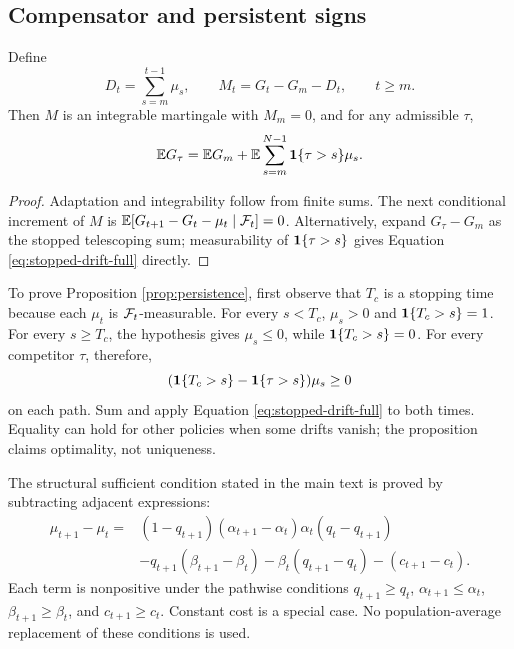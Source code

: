 \subsection{Compensator and persistent signs}
\begin{lemma}
\label{lem:doob-full}
Define
\[
 D_t=\sum_{s=m}^{t-1}\mu_s,\qquad M_t=G_t-G_m-D_t,\qquad t\ge m.
\]
Then \(M\) is an integrable martingale with \(M_m=0\), and for any admissible
\(\tau\),
\begin{equation}
 \mathbb E G_\tau=\mathbb E G_m+
 \mathbb E\sum_{s=m}^{N-1}\mathbf 1\{\tau>s\}\mu_s .
 \label{eq:stopped-drift-full}
\end{equation}
\end{lemma}
\begin{proof}
Adaptation and integrability follow from finite sums.
The next conditional increment of \(M\) is
\(\mathbb E[G_{t+1}-G_t-\mu_t\mid\mathcal F_t]=0\).
Alternatively, expand \(G_\tau-G_m\) as the stopped telescoping sum;
measurability of \(\mathbf 1\{\tau>s\}\) gives Equation
\eqref{eq:stopped-drift-full} directly.
\end{proof}

To prove Proposition \ref{prop:persistence}, first observe that \(T_c\)
is a stopping time because each \(\mu_t\) is \(\mathcal F_t\)-measurable.
For every \(s<T_c\), \(\mu_s>0\) and \(\mathbf 1\{T_c>s\}=1\).
For every \(s\ge T_c\), the hypothesis gives \(\mu_s\le0\), while
\(\mathbf 1\{T_c>s\}=0\). For every competitor \(\tau\), therefore,
\[
 (\mathbf 1\{T_c>s\}-\mathbf 1\{\tau>s\})\mu_s\ge0
\]
on each path. Sum and apply Equation \eqref{eq:stopped-drift-full} to both
times. Equality can hold for other policies when some drifts vanish;
the proposition claims optimality, not uniqueness.

The structural sufficient condition stated in the main text is proved by
subtracting adjacent expressions:
\begin{align}
 \mu_{t+1}-\mu_t={}&
 (1-q_{t+1})(\alpha_{t+1}-\alpha_t)
 \alpha_t(q_t-q_{t+1}) \nonumber\\
 &-q_{t+1}(\beta_{t+1}-\beta_t)
 -\beta_t(q_{t+1}-q_t)-(c_{t+1}-c_t).
 \label{eq:monotone-drift-full}
\end{align}
Each term is nonpositive under the pathwise conditions
\(q_{t+1}\ge q_t\), \(\alpha_{t+1}\le\alpha_t\),
\(\beta_{t+1}\ge\beta_t\), and \(c_{t+1}\ge c_t\).
Constant cost is a special case. No population-average replacement of these
conditions is used.

